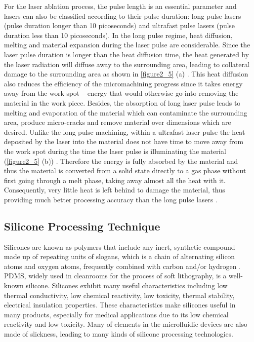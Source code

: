 For the laser ablation process, the pulse length is an essential parameter and lasers can also be classified according to their pulse duration: long pulse lasers (pulse duration longer than 10 picoseconds) and ultrafast pulse lasers (pulse duration less than 10 picoseconds). In the long pulse regime, heat diffusion, melting and material expansion during the laser pulse are considerable. Since the laser pulse duration is longer than the heat diffusion time, the heat generated by the laser radiation will diffuse away to the surrounding area, leading to collateral damage to the surrounding area as shown in \autoref{figure2_5} (a) \cite{ref_4}. This heat diffusion also reduces the efficiency of the micromachining progress since it takes energy away from the work spot -- energy that would otherwise go into removing the material in the work piece. Besides, the absorption of long laser pulse leads to melting and evaporation of the material which can contaminate the surrounding area, produce micro-cracks and remove material over dimensions which are desired. Unlike the long pulse machining, within a ultrafast laser pulse the heat deposited by the laser into the material does not have time to move away from the work spot during the time the laser pulse is illuminating the material (\autoref{figure2_5} (b)) \cite{ref_4}. Therefore the energy is fully absorbed by the material and thus the material is converted from a solid state directly to a gas phase without first going through a melt phase, taking away almost all the heat with it. Consequently, very little heat is left behind to damage the material, thus providing much better processing accuracy than the long pulse lasers \cite{chichkov1996femtosecond}.

\subsection{Silicone Processing Technique}
\label{2_2_2}
Silicones are known as polymers that include any inert, synthetic compound made up of repeating units of slogans, which is a chain of alternating silicon atoms and oxygen atoms, frequently combined with carbon and/or hydrogen \cite{moretto2000silicones}. PDMS, widely used in cleanrooms for the process of soft lithography, is a well-known silicone. Silicones exhibit many useful characteristics including low thermal conductivity, low chemical reactivity, low toxicity, thermal stability, electrical insulation properties. These characteristics make silicones useful in many products, especially for medical applications due to its low chemical reactivity and low toxicity. Many of elements in the microfluidic devices are also made of slickness, leading to many kinds of silicone processing technologies.\\

